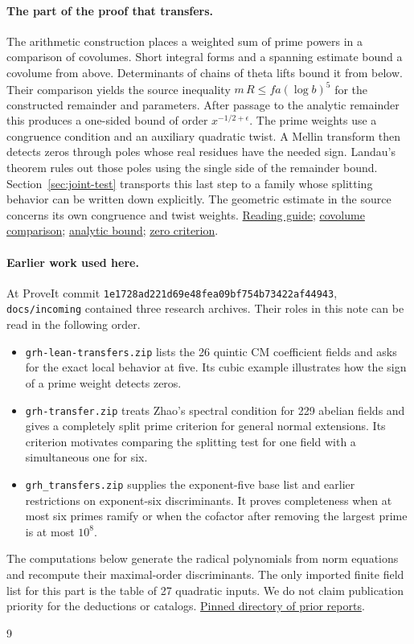 \documentclass[11pt,letterpaper]{article}
\newcommand{\repo}[2]{\href{https://github.com/lsernau/grh-lean/blob/72fead102f663d5c7a407964a13dc0cf9d977207/grh/#1}{#2}}
\begin{document}
\paragraph{The part of the proof that transfers.}
The arithmetic construction places a weighted sum of prime powers in a comparison of covolumes. Short integral forms and a spanning estimate bound a covolume from above. Determinants of chains of theta lifts bound it from below. Their comparison yields the source inequality $m\,R\le f a(\log b)^5$ for the constructed remainder and parameters. After passage to the analytic remainder this produces a one-sided bound of order $x^{-1/2+\epsilon}$. The prime weights use a congruence condition and an auxiliary quadratic twist. A Mellin transform then detects zeros through poles whose real residues have the needed sign. Landau's theorem rules out those poles using the single side of the remainder bound. Section~\ref{sec:joint-test} transports this last step to a family whose splitting behavior can be written down explicitly. The geometric estimate in the source concerns its own congruence and twist weights.
\repo{GUIDE.md}{Reading guide};
\repo{src/New/Reduction/MainInequality.lean}{covolume comparison};
\repo{src/New/Reduction/OneSidedBound.lean}{analytic bound};
\repo{src/New/Reduction/Zeros/Criterion.lean}{zero criterion}.

\paragraph{Earlier work used here.}
At ProveIt commit \texttt{1e1728ad221d69e48fea09bf754b73422af44943}, \texttt{docs/incoming} contained three research archives. Their roles in this note can be read in the following order.
\begin{itemize}
\item \texttt{grh-lean-transfers.zip} lists the 26 quintic CM coefficient fields and asks for the exact local behavior at five. Its cubic example illustrates how the sign of a prime weight detects zeros.
\item \texttt{grh-transfer.zip} treats Zhao's spectral condition for 229 abelian fields and gives a completely split prime criterion for general normal extensions. Its criterion motivates comparing the splitting test for one field with a simultaneous one for six.
\item \texttt{grh\_transfers.zip} supplies the exponent-five base list and earlier restrictions on exponent-six discriminants. It proves completeness when at most six primes ramify or when the cofactor after removing the largest prime is at most $10^8$.
\end{itemize}
The computations below generate the radical polynomials from norm equations and recompute their maximal-order discriminants. The only imported finite field list for this part is the table of 27 quadratic inputs. We do not claim publication priority for the deductions or catalogs.
\href{https://github.com/VladimirReshetnikov/ProveIt/tree/1e1728ad221d69e48fea09bf754b73422af44943/docs/incoming}{Pinned directory of prior reports}.

\par\medskip
\par\medskip
\par\medskip
\par\medskip

\begin{thebibliography}{9}

\end{thebibliography}
\end{document}
